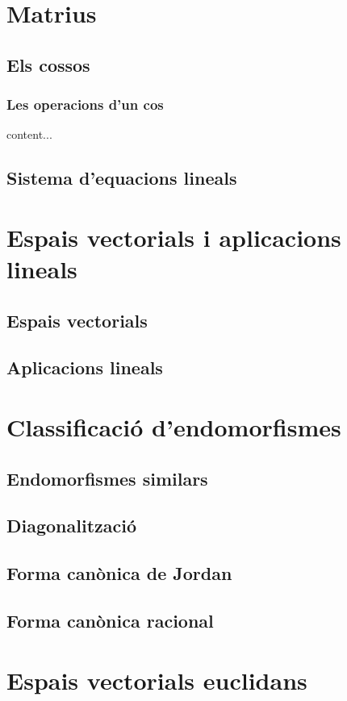 \documentclass[../Apunts.tex]{subfiles}
\begin{document}
\chapter{Matrius}
\section{Els cossos}
\subsection{Les operacions d'un cos}
\begin{definition}[Cos]
	content...
\end{definition}
\section{Sistema d'equacions lineals}

\chapter{Espais vectorials i aplicacions lineals}
\section{Espais vectorials}
\section{Aplicacions lineals}

\chapter{Classificació d'endomorfismes}
\section{Endomorfismes similars}
\section{Diagonalització}
\section{Forma canònica de Jordan}
\section{Forma canònica racional}

\chapter{Espais vectorials euclidans}
\end{document}
